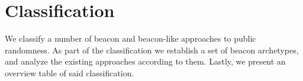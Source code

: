 \section{Classification}\label{sec:classification}

We classify a number of beacon and beacon-like approaches to public randomness.
As part of the classification we establish a set of beacon archetypes, and analyze the existing approaches according to them.
Lastly, we present an overview table of said classification.

